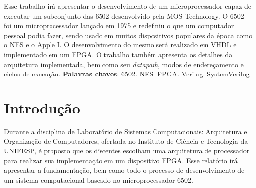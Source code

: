 \documentclass[
	12pt,				  %
	openright,		%
	a4paper,			%
	english,			%
	french,				%
	spanish,			%
	brazil,				%
]{abntex2}
\begin{document}

\frenchspacing


\imprimircapa

\imprimirfolhaderosto*


\setlength{\absparsep}{18pt} %
\begin{resumo}
	Esse trabalho irá apresentar o desenvolvimento de um microprocessador capaz
	de executar um subconjunto das 6502 desenvolvido pela MOS Technology.
	O 6502 foi um microprocessador lançado em 1975 e redefiniu o que um computador
	pessoal podia fazer, sendo usado em muitos dispositivos populares da época
	como o NES e o Apple I. O desenvolvimento do mesmo será realizado em VHDL e
	implementado em um FPGA. O trabalho também apresenta os detalhes da arquitetura
	implementada, bem como seu \emph{datapath}, modos de endereçamento e ciclos de
	execução. \newline\newline
	\textbf{Palavras-chaves}: 6502. NES. FPGA. Verilog. SystemVerilog
	\noindent
\end{resumo}



\listoffigures*
\clearpage

\listoftables*
\clearpage

\listoflistings

\tableofcontents*


\textual

\chapter{Introdução}
Durante a disciplina de Laboratório de Sistemas Computacionais:
Arquitetura e Organização de Computadores, ofertada no Instituto de Ciência
e Tecnologia da UNIFESP, é proposto que os discentes
escolham uma arquitetura de processador para realizar sua implementação em um
dispositivo FPGA. Esse relatório irá apresentar a fundamentação, bem como todo
o processo de desenvolvimento de um sistema computacional baseado no
microprocessador 6502.
\end{document}
